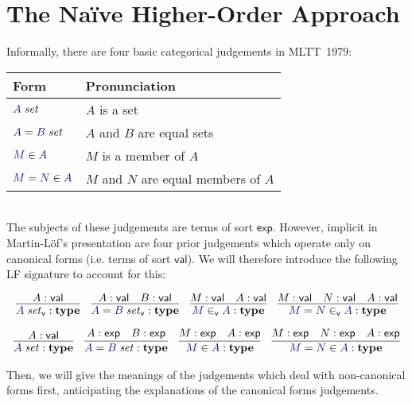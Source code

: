 \documentclass[acmtoplas]{acmtrans2m}
\def\InputModeColorName{MidnightBlue}
\newcommand\InputMode[1]{{\color{\InputModeColorName}{#1}}}
\newcommand\type{\mathbf{type}}
\newcommand\sortval{\mathsf{val}}
\newcommand\sortexp{\mathsf{exp}}
\newcommand\isset[1]{\InputMode{#1}\;\mathit{set}}
\newcommand\eqset[2]{\InputMode{#1}=\InputMode{#2}\;\mathit{set}}
\newcommand\mem[2]{\InputMode{#1}\in\InputMode{#2}}
\newcommand\eqmem[3]{\InputMode{#1}=\InputMode{#2}\in\InputMode{#3}}
\newcommand\canset[1]{\InputMode{#1}\;\mathit{set}_\mathsf{v}}
\newcommand\eqcanset[2]{\InputMode{#1}=\InputMode{#2}\;\mathit{set}_\mathsf{v}}
\newcommand\canmem[2]{\InputMode{#1}\in_\mathsf{v}\InputMode{#2}}
\newcommand\eqcanmem[3]{\InputMode{#1}=\InputMode{#2}\in_\mathsf{v}\InputMode{#3}}
\begin{document}
\section{The Na\"ive Higher-Order Approach}

Informally, there are four basic categorical judgements in MLTT~1979:\\

\begin{tabular}{ll}
  \toprule
  Form & Pronunciation\\
  \midrule
  $\isset{A}$ & $A$ is a set\\
  $\eqset{A}{B}$ & $A$ and $B$ are equal sets\\
  $\mem{M}{A}$ & $M$ is a member of $A$\\
  $\eqmem{M}{N}{A}$ & $M$ and $N$ are equal members of $A$\\
  \bottomrule
\end{tabular}\\

\medskip\noindent The subjects of these judgements are terms of sort
$\sortexp$. However, implicit in Martin-L\"of's presentation are four prior
judgements which operate only on canonical forms (i.e. terms of sort
$\sortval$). We will therefore introduce the following LF signature to account
for this:

\begin{gather*}
  \infer{
    \canset{A}:\type
  }{
    A:\sortval
  }\quad
  \infer{
    \eqcanset{A}{B}:\type
  }{
    A:\sortval &
    B:\sortval
  }\quad
  \infer{
    \canmem{M}{A}:\type
  }{
    M:\sortval &
    A:\sortval
  }\quad
  \infer{
    \eqcanmem{M}{N}{A}:\type
  }{
    M:\sortval &
    N:\sortval &
    A:\sortval
  }\\[6pt]
  \infer{
    \isset{A}:\type
  }{
    A:\sortval
  }\quad
  \infer{
    \eqset{A}{B}:\type
  }{
    A:\sortexp &
    B:\sortexp
  }\quad
  \infer{
    \mem{M}{A}:\type
  }{
    M:\sortexp &
    A:\sortexp
  }\quad
  \infer{
    \eqmem{M}{N}{A}:\type
  }{
    M:\sortexp &
    N:\sortexp &
    A:\sortexp
  }
\end{gather*}

Then, we will give the meanings of the judgements which deal with non-canonical
forms first, anticipating the explanations of the canonical forms judgements.
\end{document}
